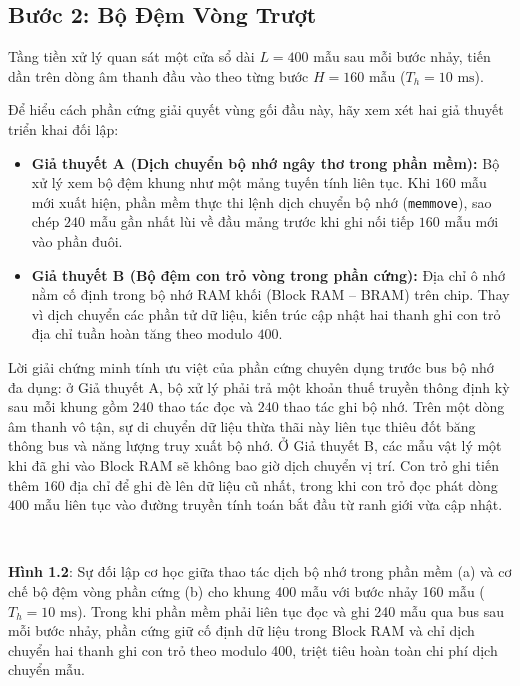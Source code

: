 \documentclass[11pt,a4paper]{article}
\renewcommand{\thefigure}{1.2\alph{figure}}
\begin{document}
\subsection*{Bước 2: Bộ Đệm Vòng Trượt}

Tầng tiền xử lý quan sát một cửa sổ dài $L = 400$ mẫu sau mỗi bước nhảy, tiến dần trên dòng âm thanh đầu vào theo từng bước $H = 160$ mẫu ($T_h = 10\text{ ms}$).

Để hiểu cách phần cứng giải quyết vùng gối đầu này, hãy xem xét hai giả thuyết triển khai đối lập:

\begin{itemize}\setlength{\itemsep}{1pt}\setlength{\parskip}{0pt}
    \item \textbf{Giả thuyết A (Dịch chuyển bộ nhớ ngây thơ trong phần mềm):} Bộ xử lý xem bộ đệm khung như một mảng tuyến tính liên tục. Khi $160$ mẫu mới xuất hiện, phần mềm thực thi lệnh dịch chuyển bộ nhớ (\texttt{memmove}), sao chép $240$ mẫu gần nhất lùi về đầu mảng trước khi ghi nối tiếp $160$ mẫu mới vào phần đuôi.
    \item \textbf{Giả thuyết B (Bộ đệm con trỏ vòng trong phần cứng):} Địa chỉ ô nhớ nằm cố định trong bộ nhớ RAM khối (Block RAM -- BRAM) trên chip. Thay vì dịch chuyển các phần tử dữ liệu, kiến trúc cập nhật hai thanh ghi con trỏ địa chỉ tuần hoàn tăng theo modulo $400$.
\end{itemize}

Lời giải chứng minh tính ưu việt của phần cứng chuyên dụng trước bus bộ nhớ đa dụng: ở Giả thuyết A, bộ xử lý phải trả một khoản thuế truyền thông định kỳ sau mỗi khung gồm $240$ thao tác đọc và $240$ thao tác ghi bộ nhớ. Trên một dòng âm thanh vô tận, sự di chuyển dữ liệu thừa thãi này liên tục thiêu đốt băng thông bus và năng lượng truy xuất bộ nhớ. Ở Giả thuyết B, các mẫu vật lý một khi đã ghi vào Block RAM sẽ không bao giờ dịch chuyển vị trí. Con trỏ ghi tiến thêm $160$ địa chỉ để ghi đè lên dữ liệu cũ nhất, trong khi con trỏ đọc phát dòng $400$ mẫu liên tục vào đường truyền tính toán bắt đầu từ ranh giới vừa cập nhật.

\begin{center}\vspace{-2mm}
\begin{minipage}{\textwidth}
\centering
\\[2mm]
\label{fig:1_2a_ring_buffer}
\begin{minipage}{0.95\textwidth}
\small\textbf{Hình \thefigure}: Sự đối lập cơ học giữa thao tác dịch bộ nhớ trong phần mềm (a) và cơ chế bộ đệm vòng phần cứng (b) cho khung 400 mẫu với bước nhảy 160 mẫu ($T_h = 10\text{ ms}$). Trong khi phần mềm phải liên tục đọc và ghi 240 mẫu qua bus sau mỗi bước nhảy, phần cứng giữ cố định dữ liệu trong Block RAM và chỉ dịch chuyển hai thanh ghi con trỏ theo modulo 400, triệt tiêu hoàn toàn chi phí dịch chuyển mẫu.
\end{minipage}
\end{minipage}\vspace{-2mm}
\end{center}
\end{document}
